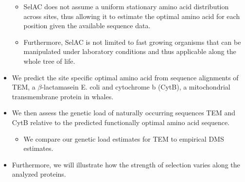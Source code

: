\documentclass[12pt]{article}
\begin{document}
\begin{itemize}
\begin{itemize}
		\item SelAC does not assume a uniform stationary amino acid distribution across sites, thus allowing it to estimate the optimal amino acid for each position given the available sequence data.
		\item Furthermore, SelAC is not limited to  fast growing organisms that can be manipulated under laboratory conditions and thus applicable along the whole tree of life.
	\end{itemize}
	\item We predict the site specific optimal amino acid from sequence alignments of TEM, a $\beta$-lactamasein E. coli and cytochrome b (CytB), a mitochondrial transmembrane protein in whales.
	\item We then assess the genetic load of naturally occurring sequences TEM and CytB relative to the predicted functionally optimal amino acid sequence.
	\begin{itemize}
		\item We compare our genetic load estimates for TEM to empirical DMS estimates.
	\end{itemize}
	\item Furthermore, we will illustrate how the strength of selection varies along the analyzed proteins.
\end{itemize}
\end{document}
